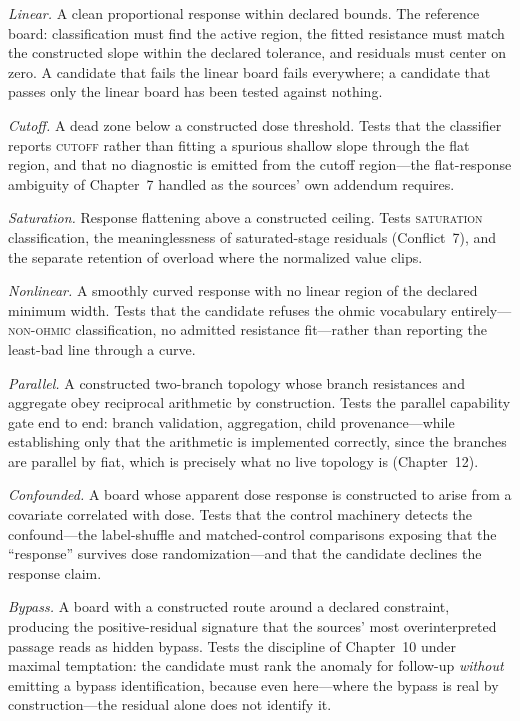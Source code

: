 \emph{Linear.} A clean proportional response within declared bounds. The reference board: classification must find the active region, the fitted resistance must match the constructed slope within the declared tolerance, and residuals must center on zero. A candidate that fails the linear board fails everywhere; a candidate that passes only the linear board has been tested against nothing.

\emph{Cutoff.} A dead zone below a constructed dose threshold. Tests that the classifier reports \textsc{cutoff} rather than fitting a spurious shallow slope through the flat region, and that no diagnostic is emitted from the cutoff region---the flat-response ambiguity of Chapter~7 handled as the sources' own addendum requires.

\emph{Saturation.} Response flattening above a constructed ceiling. Tests \textsc{saturation} classification, the meaninglessness of saturated-stage residuals (Conflict~7), and the separate retention of overload where the normalized value clips.

\emph{Nonlinear.} A smoothly curved response with no linear region of the declared minimum width. Tests that the candidate refuses the ohmic vocabulary entirely---\textsc{non-ohmic} classification, no admitted resistance fit---rather than reporting the least-bad line through a curve.

\emph{Parallel.} A constructed two-branch topology whose branch resistances and aggregate obey reciprocal arithmetic by construction. Tests the parallel capability gate end to end: branch validation, aggregation, child provenance---while establishing only that the arithmetic is implemented correctly, since the branches are parallel by fiat, which is precisely what no live topology is (Chapter~12).

\emph{Confounded.} A board whose apparent dose response is constructed to arise from a covariate correlated with dose. Tests that the control machinery detects the confound---the label-shuffle and matched-control comparisons exposing that the ``response'' survives dose randomization---and that the candidate declines the response claim.

\emph{Bypass.} A board with a constructed route around a declared constraint, producing the positive-residual signature that the sources' most overinterpreted passage reads as hidden bypass. Tests the discipline of Chapter~10 under maximal temptation: the candidate must rank the anomaly for follow-up \emph{without} emitting a bypass identification, because even here---where the bypass is real by construction---the residual alone does not identify it.

